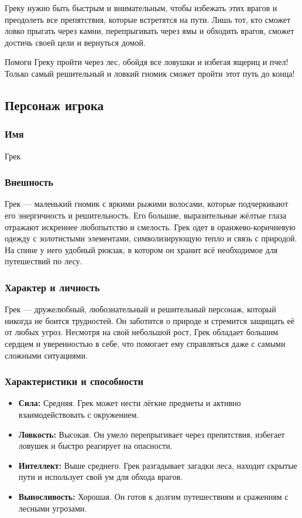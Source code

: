 \documentclass{article}
\begin{document}
Греку нужно быть быстрым и внимательным, чтобы избежать этих врагов и преодолеть все препятствия, которые встретятся на пути. Лишь тот, кто сможет ловко прыгать через камни, перепрыгивать через ямы и обходить врагов, сможет достичь своей цели и вернуться домой.

Помоги Греку пройти через лес, обойдя все ловушки и избегая ящериц и пчел! Только самый решительный и ловкий гномик сможет пройти этот путь до конца!


\subsection{Персонаж игрока}

\subsubsection{Имя} 
Грек

\subsubsection{Внешность} 
Грек — маленький гномик с яркими рыжими волосами, которые подчеркивают его энергичность и решительность. Его большие, выразительные жёлтые глаза отражают искреннее любопытство и смелость. Грек одет в оранжево-коричневую одежду с золотистыми элементами, символизирующую тепло и связь с природой. На спине у него удобный рюкзак, в котором он хранит всё необходимое для путешествий по лесу.

\subsubsection{Характер и личность} 
Грек — дружелюбный, любознательный и решительный персонаж, который никогда не боится трудностей. Он заботится о природе и стремится защищать её от любых угроз. Несмотря на свой небольшой рост, Грек обладает большим сердцем и уверенностью в себе, что помогает ему справляться даже с самыми сложными ситуациями.

\subsubsection{Характеристики и способности} 
\begin{itemize}
    \item \textbf{Сила:} Средняя. Грек может нести лёгкие предметы и активно взаимодействовать с окружением.
    \item \textbf{Ловкость:} Высокая. Он умело перепрыгивает через препятствия, избегает ловушек и быстро реагирует на опасности.
    \item \textbf{Интеллект:} Выше среднего. Грек разгадывает загадки леса, находит скрытые пути и использует свой ум для обхода врагов.
    \item \textbf{Выносливость:} Хорошая. Он готов к долгим путешествиям и сражениям с лесными угрозами.
\end{itemize}
\end{document}

